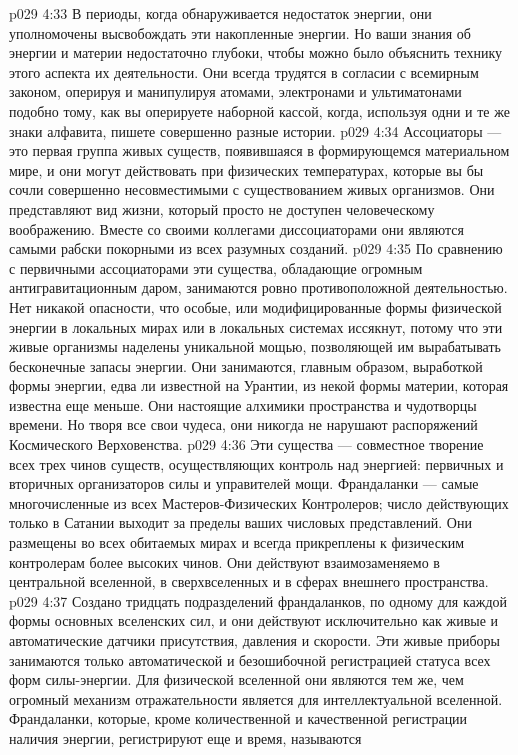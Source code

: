 \vs p029 4:33 В периоды, когда обнаруживается недостаток энергии, они уполномочены высвобождать эти накопленные энергии. Но ваши знания об энергии и материи недостаточно глубоки, чтобы можно было объяснить технику этого аспекта их деятельности. Они всегда трудятся в согласии с всемирным законом, оперируя и манипулируя атомами, электронами и ультиматонами подобно тому, как вы оперируете наборной кассой, когда, используя одни и те же знаки алфавита, пишете совершенно разные истории.
\vs p029 4:34 Ассоциаторы --- это первая группа живых существ, появившаяся в формирующемся материальном мире, и они могут действовать при физических температурах, которые вы бы сочли совершенно несовместимыми с существованием живых организмов. Они представляют вид жизни, который просто не доступен человеческому воображению. Вместе со своими коллегами диссоциаторами они являются самыми рабски покорными из всех разумных созданий.
\vs p029 4:35 \bibnobreakspace {} По сравнению с первичными ассоциаторами эти существа, обладающие огромным антигравитационным даром, занимаются ровно противоположной деятельностью. Нет никакой опасности, что особые, или модифицированные формы физической энергии в локальных мирах или в локальных системах иссякнут, потому что эти живые организмы наделены уникальной мощью, позволяющей им вырабатывать бесконечные запасы энергии. Они занимаются, главным образом, выработкой формы энергии, едва ли известной на Урантии, из некой формы материи, которая известна еще меньше. Они настоящие алхимики пространства и чудотворцы времени. Но творя все свои чудеса, они никогда не нарушают распоряжений Космического Верховенства.
\vs p029 4:36 \bibnobreakspace {} Эти существа --- совместное творение всех трех чинов существ, осуществляющих контроль над энергией: первичных и вторичных организаторов силы и управителей мощи. Франдаланки --- самые многочисленные из всех Мастеров\hyp{}Физических Контролеров; число действующих только в Сатании выходит за пределы ваших числовых представлений. Они размещены во всех обитаемых мирах и всегда прикреплены к физическим контролерам более высоких чинов. Они действуют взаимозаменяемо в центральной вселенной, в сверхвселенных и в сферах внешнего пространства.
\vs p029 4:37 Создано тридцать подразделений франдаланков, по одному для каждой формы основных вселенских сил, и они действуют исключительно как живые и автоматические датчики присутствия, давления и скорости. Эти живые приборы занимаются только автоматической и безошибочной регистрацией статуса всех форм силы\hyp{}энергии. Для физической вселенной они являются тем же, чем огромный механизм отражательности является для интеллектуальной вселенной. Франдаланки, которые, кроме количественной и качественной регистрации наличия энергии, регистрируют еще и время, называются 
